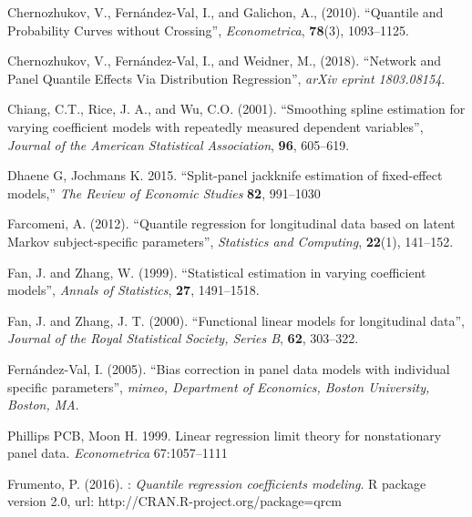 \documentclass[12pt]{article}
\begin{document}
\begin{thebibliography}{7}
 Chernozhukov, V., Fern\'andez-Val,
I., and Galichon, A., (2010).
\newblock ``Quantile and Probability Curves without
Crossing'',
\newblock \textit{Econometrica}, \textbf{78}(3),  1093--1125.


Chernozhukov, V., Fern\'andez-Val, I., and Weidner, M., (2018).
\newblock ``Network and Panel Quantile Effects Via Distribution Regression'',
\newblock \textit{arXiv eprint 1803.08154}.

Chiang, C.T., Rice, J. A., and Wu, C.O. (2001).
\newblock ``Smoothing spline estimation for varying coefficient models with repeatedly measured dependent variables'',
\newblock \textit{Journal of the American Statistical Association}, \textbf{96}, 605--619.

Dhaene G, Jochmans K. 2015.
\newblock ``Split-panel jackknife estimation of fixed-effect models,''
\newblock \textit{The Review of Economic Studies} \textbf{82}, 991--1030

Farcomeni, A. (2012).
\newblock ``Quantile regression for longitudinal data based on latent Markov subject-specific parameters'',
\newblock \textit{Statistics and Computing}, \textbf{22}(1), 141--152.


Fan, J. and Zhang, W. (1999).
\newblock ``Statistical estimation in varying coefficient models'',
\newblock \textit{Annals of Statistics}, \textbf{27}, 1491--1518.

Fan, J. and Zhang, J. T. (2000).
\newblock ``Functional linear models for longitudinal data'',
\newblock \textit{Journal of the Royal Statistical Society, Series B}, \textbf{62}, 303--322.


Fern\'andez-Val, I. (2005).
\newblock ``Bias correction in panel data models with individual specific parameters'',
\newblock \textit{mimeo, Department of Economics, Boston University, Boston, MA}.

Phillips PCB, Moon H. 1999.
Linear regression limit theory for nonstationary panel data.
\textit{Econometrica} 67:1057--1111


Frumento, P. (2016).
: \textit{Quantile regression coefficients modeling}.
\newblock R package version 2.0, url: http://CRAN.R-project.org/package=qrcm



\end{thebibliography}
\end{document}
